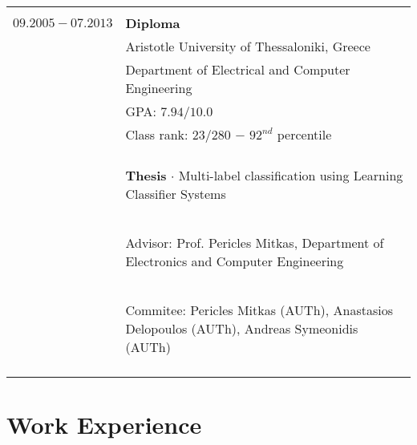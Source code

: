 \documentclass[a4paper,10pt,twoside]{article}
\begin{document}
\begin{tabular}{rp{11cm}}
&\\
$09.2005 - 07.2013$  & \textbf{Diploma} \\
                     & Aristotle University of Thessaloniki, Greece \\
                     & Department of Electrical and Computer Engineering \\
                     & GPA: $7.94 / 10.0$ \\
                     & Class rank: $23 / 280$ $-$ $92^{nd}$ percentile \\
                     &\\
                     & \begin{small}\textbf{Thesis} $\cdot$ Multi-label classification using Learning Classifier Systems \end{small}\\
                     & \begin{small}Advisor: Prof. Pericles Mitkas, Department of Electronics and Computer Engineering\end{small}\\
                     & \begin{small}Commitee: Pericles Mitkas (AUTh), Anastasios Delopoulos (AUTh), Andreas Symeonidis (AUTh) \end{small}\\
&\\


\end{tabular}





\section{Work Experience}
\end{document}
